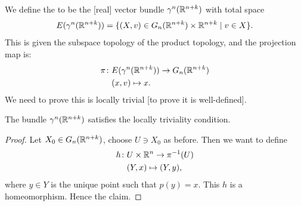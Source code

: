 \begin{definition}
We define the 
to be the [real] vector bundle $\gamma^{n}(\mathbb{R}^{n+k})$ with total
space
\begin{equation}
E(\gamma^{n}(\mathbb{R}^{n+k}))=\{(X,v)\in
G_{n}(\mathbb{R}^{n+k})\times\mathbb{R}^{n+k}\mid v\in X\}.
\end{equation}
This is given the subspace topology of the product topology, and the
projection map is:
\begin{align}
\pi\colon & E(\gamma^{n}(\mathbb{R}^{n+k}))\to G_{n}(\mathbb{R}^{n+k})\\
&(x,v)\mapsto x.\nonumber
\end{align}
We need to prove this is locally trivial [to prove it is well-defined].
\end{definition}

\begin{lemma}
The bundle $\gamma^{n}(\mathbb{R}^{n+k})$ satisfies the locally triviality condition.
\end{lemma}

\begin{proof}
Let $X_{0}\in G_{n}(\mathbb{R}^{n+k})$, choose $U\ni X_{0}$ as before. Then
we want to define
\begin{align}
h\colon & U\times\mathbb{R}^{n}\to\pi^{-1}(U)\\
&(Y,x)\mapsto(Y,y),\nonumber
\end{align}
where $y\in Y$ is the unique point such that $p(y)=x$. This $h$ is a
homeomorphism. Hence the claim.
\end{proof}

